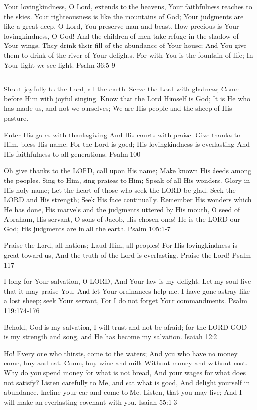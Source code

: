 \documentclass[]{book}
\begin{document}
Your lovingkindness, O Lord, extends to the heavens, Your faithfulness
reaches to the skies. Your righteousness is like the mountains of God;
Your judgments are like a great deep. O Lord, You preserve man and
beast. How precious is Your lovingkindness, O God! And the children of
men take refuge in the shadow of Your wings. They drink their fill of
the abundance of Your house; And You give them to drink of the river of
Your delights. For with You is the fountain of life; In Your light we
see light. \textbar{} Psalm 36:5-9

\begin{center}\rule{0.5\linewidth}{\linethickness}\end{center}

Shout joyfully to the Lord, all the earth. Serve the Lord with gladness;
Come before Him with joyful singing. Know that the Lord Himself is God;
It is He who has made us, and not we ourselves; We are His people and
the sheep of His pasture.

Enter His gates with thanksgiving And His courts with praise. Give
thanks to Him, bless His name. For the Lord is good; His lovingkindness
is everlasting And His faithfulness to all generations. \textbar{} Psalm
100

Oh give thanks to the LORD, call upon His name; Make known His deeds
among the peoples. Sing to Him, sing praises to Him; Speak of all His
wonders. Glory in His holy name; Let the heart of those who seek the
LORD be glad. Seek the LORD and His strength; Seek His face continually.
Remember His wonders which He has done, His marvels and the judgments
uttered by His mouth, O seed of Abraham, His servant, O sons of Jacob,
His chosen ones! He is the LORD our God; His judgments are in all the
earth. \textbar{} Psalm 105:1-7

Praise the Lord, all nations; Laud Him, all peoples! For His
lovingkindness is great toward us, And the truth of the Lord is
everlasting. Praise the Lord! \textbar{} Psalm 117

I long for Your salvation, O LORD, And Your law is my delight. Let my
soul live that it may praise You, And let Your ordinances help me. I
have gone astray like a lost sheep; seek Your servant, For I do not
forget Your commandments. \textbar{} Psalm 119:174-176

Behold, God is my salvation, I will trust and not be afraid; for the
LORD GOD is my strength and song, and He has become my salvation.
\textbar{} Isaiah 12:2

Ho! Every one who thirsts, come to the waters; And you who have no money
come, buy and eat. Come, buy wine and milk Without money and without
cost. Why do you spend money for what is not bread, And your wages for
what does not satisfy? Listen carefully to Me, and eat what is good, And
delight yourself in abundance. Incline your ear and come to Me. Listen,
that you may live; And I will make an everlasting covenant with you.
\textbar{} Isaiah 55:1-3
\end{document}
